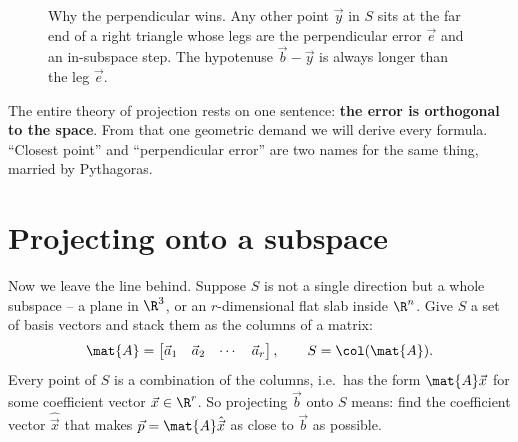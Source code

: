 \begin{figure}[H]
\centering
{}
\caption{Why the perpendicular wins. Any other point $\vec{y}$ in $S$ sits at the far end of a
right triangle whose legs are the perpendicular error $\vec{e}$ and an in-subspace step. The
hypotenuse $\vec{b}-\vec{y}$ is always longer than the leg $\vec{e}$.}
\label{ch18:pythagoras}
\end{figure}

\begin{focusbox}
The entire theory of projection rests on one sentence: \textbf{the error is orthogonal to the
space}. From that one geometric demand we will derive every formula. ``Closest point'' and
``perpendicular error'' are two names for the same thing, married by Pythagoras.
\end{focusbox}

\section{Projecting onto a subspace}

Now we leave the line behind. Suppose $S$ is not a single direction but a whole subspace -- a plane
in $\R^3$, or an $r$-dimensional flat slab inside $\R^n$. Give $S$ a set of basis vectors and stack
them as the columns of a matrix:
\[
  \mat{A} = \begin{bmatrix} \vec{a}_1 & \vec{a}_2 & \cdots & \vec{a}_r \end{bmatrix},
  \qquad
  S = \col(\mat{A}).
\]
Every point of $S$ is a combination of the columns, i.e.\ has the form $\mat{A}\vec{x}$ for some
coefficient vector $\vec{x}\in\R^r$. So projecting $\vec{b}$ onto $S$ means: find the coefficient
vector $\hat{\vec{x}}$ that makes $\vec{p}=\mat{A}\hat{\vec{x}}$ as close to $\vec{b}$ as possible.

